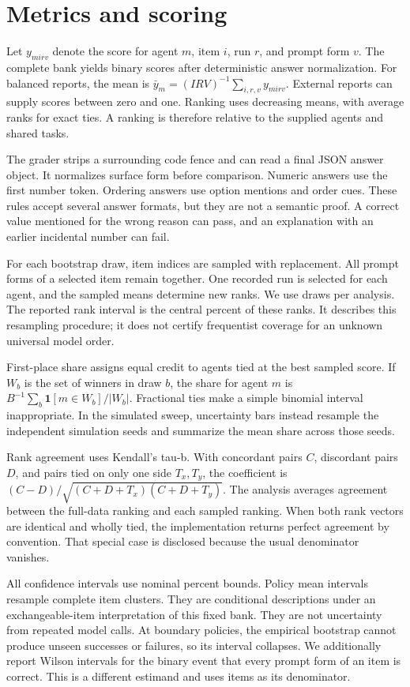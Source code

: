 \documentclass{article}
\begin{document}
\section{Metrics and scoring}
Let $y_{mirv}$ denote the score for agent $m$, item $i$, run $r$, and prompt form $v$. The complete bank yields binary scores after deterministic answer normalization. For balanced reports, the mean is $\bar y_m=(IRV)^{-1}\sum_{i,r,v} y_{mirv}$. External reports can supply scores between zero and one. Ranking uses decreasing means, with average ranks for exact ties. A ranking is therefore relative to the supplied agents and shared tasks.\par
The grader strips a surrounding code fence and can read a final JSON answer object. It normalizes surface form before comparison. Numeric answers use the first number token. Ordering answers use option mentions and order cues. These rules accept several answer formats, but they are not a semantic proof. A correct value mentioned for the wrong reason can pass, and an explanation with an earlier incidental number can fail.\par
For each bootstrap draw, item indices are sampled with replacement. All prompt forms of a selected item remain together. One recorded run is selected for each agent, and the sampled means determine new ranks. We use \Draws{} draws per analysis. The reported rank interval is the central \Level{} percent of these ranks. It describes this resampling procedure; it does not certify frequentist coverage for an unknown universal model order.\par
First-place share assigns equal credit to agents tied at the best sampled score. If $W_b$ is the set of winners in draw $b$, the share for agent $m$ is $B^{-1}\sum_b \mathbf{1}[m\in W_b]/|W_b|$. Fractional ties make a simple binomial interval inappropriate. In the simulated sweep, uncertainty bars instead resample the independent simulation seeds and summarize the mean share across those seeds.\par
Rank agreement uses Kendall's tau-b. With concordant pairs $C$, discordant pairs $D$, and pairs tied on only one side $T_x,T_y$, the coefficient is $(C-D)/\sqrt{(C+D+T_x)(C+D+T_y)}$. The analysis averages agreement between the full-data ranking and each sampled ranking. When both rank vectors are identical and wholly tied, the implementation returns perfect agreement by convention. That special case is disclosed because the usual denominator vanishes.\par
All confidence intervals use nominal \Level{} percent bounds. Policy mean intervals resample complete item clusters. They are conditional descriptions under an exchangeable-item interpretation of this fixed bank. They are not uncertainty from repeated model calls. At boundary policies, the empirical bootstrap cannot produce unseen successes or failures, so its interval collapses. We additionally report Wilson intervals for the binary event that every prompt form of an item is correct. This is a different estimand and uses items as its denominator.\par
\end{document}
